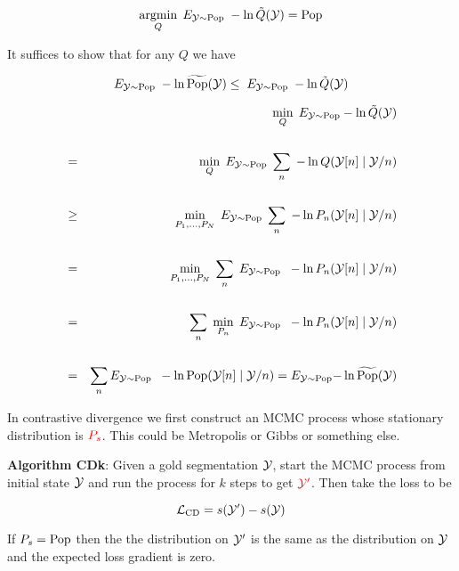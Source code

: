{

{\color{red} $$\operatorname*{argmin}_Q \; E_{{\cal Y} \sim \mathrm{Pop}} \;-\ln \tilde{Q}({\cal Y}) = \mathrm{Pop}$$}

\vfill
It suffices to show that for any $Q$ we have

\vfill
$$ E_{{\cal Y} \sim \mathrm{Pop}}\;-\ln \widetilde{\mathrm{Pop}}({\cal Y}) \leq \;E_{{\cal Y} \sim \mathrm{Pop}}\;-\ln \tilde{Q}({\cal Y})$$


{\huge
\begin{eqnarray*}
  & & \min_Q \;E_{{\cal Y}\sim \mathrm{Pop}} -\ln \tilde{Q}({\cal Y}) \\
  \\
  & = & \min_Q \;E_{{\cal Y}\sim \mathrm{Pop}} \;\sum_n\;-\ln Q({\cal Y}[n]\;|\;{\cal Y}/n) \\
  \\
  & \geq & \min_{P_1,\ldots,P_N} \;E_{{\cal Y}\sim \mathrm{Pop}} \;\sum_n\;-\ln P_n({\cal Y}[n]\;|\;{\cal Y}/n) \\
  \\
  & = & \min_{P_1,\ldots,P_N} \;\sum_n \;E_{{\cal Y} \sim \mathrm{Pop}}\;\; -\ln P_n({\cal Y}[n]\;|\;{\cal Y}/n) \\
  \\          
  & = & \sum_n \;\min_{P_n}\;E_{{\cal Y} \sim \mathrm{Pop}}\;\; -\ln P_n({\cal Y}[n]\;|\;{\cal Y}/n) \\
  \\
    & = & \sum_n E_{{\cal Y} \sim \mathrm{Pop}}\;\; -\ln \mathrm{Pop}({\cal Y}[n]\;|\;{\cal Y}/n) =  E_{{\cal Y} \sim \mathrm{Pop}}{-\ln \widetilde{\mathrm{Pop}}({\cal Y})}
\end{eqnarray*}
}


In contrastive divergence we first construct an MCMC process whose stationary distribution is ${\color{red} P_s}$.  This could be
Metropolis or Gibbs or something else.

\vfill
{\bf Algorithm CDk}: Given a gold segmentation ${\cal Y}$, start the MCMC process from initial state ${\cal Y}$ and run the process for $k$ steps
to get ${\color{red} {\cal Y}'}$.  Then take the loss to be

\vfill
{\color{red} $${\cal L}_{\mathrm{CD}}  = s({\cal Y}') - s({\cal Y})$$}

If $P_s = \mathrm{Pop}$ then the the distribution on ${\cal Y}'$ is the same as the distribution on ${\cal Y}$ and the
expected loss gradient is zero.


}
